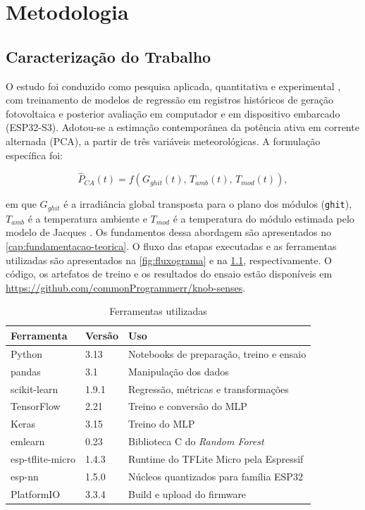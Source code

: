\chapter{Metodologia}
\label{cap:metodologia}

\section{Caracterização do Trabalho}

O estudo foi conduzido como pesquisa aplicada, quantitativa e experimental
\cite{gil2002}, com treinamento de modelos de regressão em registros
históricos de geração fotovoltaica e posterior avaliação em computador e em
dispositivo embarcado (ESP32-S3). Adotou-se a estimação contemporânea da
potência ativa em corrente alternada (PCA), a partir de três variáveis
meteorológicas. A formulação específica foi:

\begin{equation}
\label{eq:softsensor}
\hat{P}_{CA}(t) = f\left(G_{ghit}(t),\, T_{amb}(t),\, T_{mod}(t)\right),
\end{equation}

\noindent em que $G_{ghit}$ é a irradiância global transposta para o plano
dos módulos (\texttt{ghit}), $T_{amb}$ é a temperatura ambiente e $T_{mod}$
é a temperatura do módulo estimada pelo modelo de Jacques
\cite{jacques2013}. Os fundamentos dessa abordagem são apresentados no
\cref{cap:fundamentacao-teorica}. O fluxo das etapas executadas e as
ferramentas utilizadas são apresentados na \cref{fig:fluxograma} e na
\cref{tab:ferramentas}, respectivamente. O código, os artefatos de treino e
os resultados do ensaio estão disponíveis em
\url{https://github.com/commonProgrammerr/knob-senses}.

\begin{table}[htbp]
  \centering
  \small
  \caption{Ferramentas utilizadas}
  \label{tab:ferramentas}
  \begin{tabular}{lll}
    \toprule
    Ferramenta & Versão & Uso \\
    \midrule
    Python & 3.13 & Notebooks de preparação, treino e ensaio \\
    pandas & 3.1 & Manipulação dos dados \\
    scikit-learn & 1.9.1 & Regressão, métricas e transformações \\
    TensorFlow  & 2.21  & Treino e conversão do MLP \\
    Keras & 3.15 & Treino do MLP \\
    emlearn & 0.23 & Biblioteca C do \textit{Random Forest} \\
    esp-tflite-micro & 1.4.3 & Runtime do TFLite Micro pela Espressif \\
    esp-nn & 1.5.0 & Núcleos quantizados para família ESP32 \\
    PlatformIO & 3.3.4 & Build e upload do firmware \\
    \bottomrule
  \end{tabular}
\end{table}

